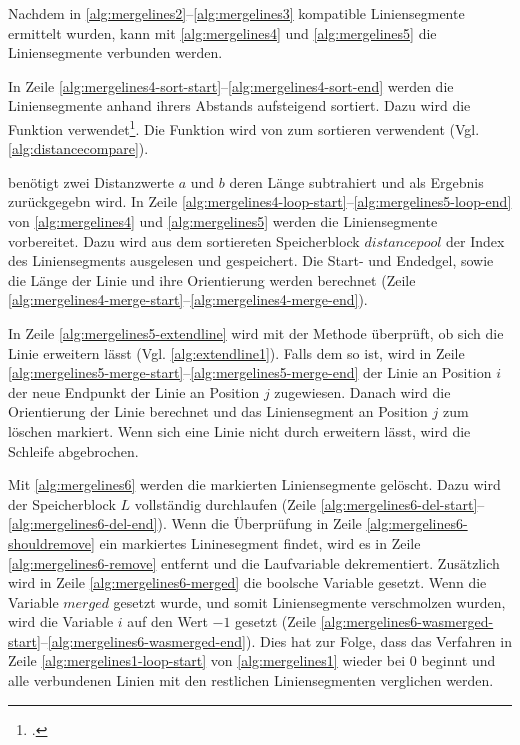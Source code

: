 Nachdem in \autoref{alg:mergelines2}--\autoref{alg:mergelines3} kompatible Liniensegmente ermittelt wurden, kann mit
 \autoref{alg:mergelines4} und \autoref{alg:mergelines5} die Liniensegmente verbunden werden.

In Zeile \ref{alg:mergelines4-sort-start}--\ref{alg:mergelines4-sort-end} werden die Liniensegmente anhand ihrers
 Abstands aufsteigend sortiert. Dazu wird die Funktion  verwendet\footcite{qsort}. Die Funktion
  wird von  zum sortieren verwendent (Vgl. \autoref{alg:distancecompare}).

 benötigt zwei Distanzwerte $a$ und $b$ deren Länge subtrahiert und als Ergebnis zurückgegebn
 wird. In Zeile \ref{alg:mergelines4-loop-start}--\ref{alg:mergelines5-loop-end} von \autoref{alg:mergelines4} und
 \autoref{alg:mergelines5} werden die Liniensegmente vorbereitet. Dazu wird aus dem sortiereten Speicherblock
 $\mathit{distancepool}$ der Index des Liniensegments ausgelesen und gespeichert. Die Start- und Endedgel, sowie die
 Länge der Linie und ihre Orientierung werden berechnet
 (Zeile \ref{alg:mergelines4-merge-start}--\ref{alg:mergelines4-merge-end}).

In Zeile \ref{alg:mergelines5-extendline} wird mit der Methode  überprüft, ob sich die Linie
 erweitern lässt (Vgl. \autoref{alg:extendline1}). Falls dem so ist, wird in Zeile
 \ref{alg:mergelines5-merge-start}--\ref{alg:mergelines5-merge-end} der Linie an Position $i$ der neue Endpunkt der
 Linie an Position $j$ zugewiesen. Danach wird die Orientierung der Linie berechnet und das Liniensegment an Position
 $j$ zum löschen markiert. Wenn sich eine Linie nicht durch  erweitern lässt, wird die Schleife
 abgebrochen.

Mit \autoref{alg:mergelines6} werden die markierten Liniensegmente gelöscht. Dazu wird der Speicherblock $L$
 vollständig durchlaufen (Zeile \ref{alg:mergelines6-del-start}--\ref{alg:mergelines6-del-end}). Wenn die Überprüfung
 in Zeile \ref{alg:mergelines6-shouldremove} ein markiertes Lininesegment findet, wird es in Zeile
 \ref{alg:mergelines6-remove} entfernt und die Laufvariable dekrementiert. Zusätzlich wird in Zeile
 \ref{alg:mergelines6-merged} die boolsche Variable gesetzt. Wenn die Variable $\mathit{merged}$ gesetzt wurde, und
 somit Liniensegmente verschmolzen wurden, wird die Variable $i$ auf den Wert $-1$ gesetzt
 (Zeile \ref{alg:mergelines6-wasmerged-start}--\ref{alg:mergelines6-wasmerged-end}). Dies hat zur Folge, dass das
 Verfahren  in Zeile \ref{alg:mergelines1-loop-start} von \autoref{alg:mergelines1} wieder bei $0$
 beginnt und alle verbundenen Linien mit den restlichen Liniensegmenten verglichen werden.

